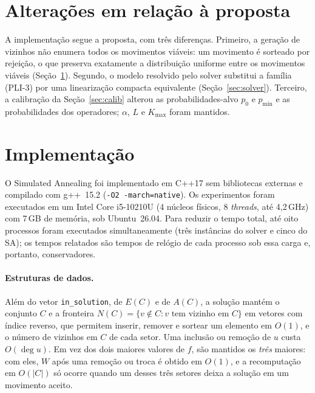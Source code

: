 \documentclass[11pt,a4paper]{article}
\begin{document}
\section*{Alterações em relação à proposta}

A implementação segue a proposta, com três diferenças. Primeiro, a geração de
vizinhos não enumera todos os movimentos viáveis: um movimento é sorteado por
rejeição, o que preserva exatamente a distribuição uniforme entre os
movimentos viáveis (Seção~\ref{sec:impl}). Segundo, o modelo resolvido pelo
solver substitui a família (PLI-3) por uma linearização compacta
equivalente (Seção~\ref{sec:solver}). Terceiro, a calibração da
Seção~\ref{sec:calib} alterou as probabilidades-alvo $p_0$ e $p_{\min}$ e as
probabilidades dos operadores; $\alpha$, $L$ e $K_{\max}$ foram mantidos.

\section{Implementação}\label{sec:impl}

O Simulated Annealing \citep{Kirkpatrick1983} foi implementado em C++17 sem bibliotecas externas e
compilado com g++~15.2 (\texttt{-O2 -march=native}). Os experimentos foram
executados em um Intel Core i5-10210U (4 núcleos físicos, 8 \emph{threads},
até 4{,}2\,GHz) com 7\,GB de memória, sob Ubuntu~26.04. Para reduzir o tempo
total, até oito processos foram executados simultaneamente (três instâncias do
solver e cinco do SA); os tempos relatados são tempos de relógio de cada
processo sob essa carga e, portanto, conservadores.

\paragraph{Estruturas de dados.} Além do vetor \texttt{in\_solution}, de
$E(C)$ e de $A(C)$, a solução mantém o conjunto $C$ e a fronteira
$N(C)=\{v\notin C : v \text{ tem vizinho em } C\}$ em vetores com índice
reverso, que permitem inserir, remover e sortear um elemento em $O(1)$, e o
número de vizinhos em $C$ de cada setor. Uma inclusão ou remoção de $u$ custa
$O(\deg u)$. Em vez dos dois maiores valores de $f$, são mantidos os
\emph{três} maiores: com eles, $W$ após uma remoção ou troca é obtido em
$O(1)$, e a recomputação em $O(|C|)$ só ocorre quando um desses três setores
deixa a solução em um movimento aceito.
\end{document}
